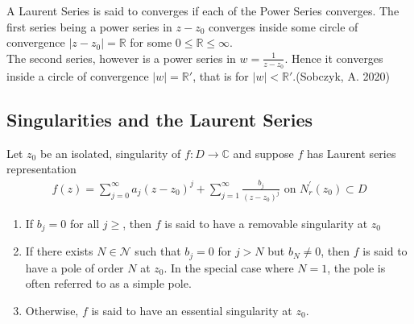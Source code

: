 \documentclass[11pt]{report}
\newcommand{\sprime}{'}
\newcommand{\dsp}{\displaystyle}
\newcommand{\NI}{\noindent}
\newcommand{\real}{ \mathbb{R}}
\newcommand{\complex}{\mathbb{C}}
\begin{document}
	\NI A Laurent Series is said to converges if each of the Power Series converges. The first series being a power series in $z-z_0$ converges inside some circle of convergence $|z-z_0|=\real$ for some $0\leq \real \leq \infty$.\\
	The second series, however is a power series in $\dsp w = \frac{1}{z-z_0}$. Hence it converges inside a circle of convergence $|w|=\real\sprime$, that is for $|w|<\real\sprime$.(Sobczyk, A. 2020)

	\subsection{Singularities and the Laurent Series}
	Let $z_0$ be an isolated, singularity of $f:D\rightarrow\complex$ and suppose $f$ has Laurent series representation
	\begin{eqnarray}
		f(z) = \sum_{j=0}^{\infty}a_j(z-z_0)^j + \sum_{j=1}^{\infty}\frac{b_j}{(z-z_0)^j} \text{ on } N_r^{\sprime}(z_0) \subset D
	\end{eqnarray}
	
	\begin{enumerate}
		\item If $b_j=0$ for all $j\geq $, then $f$ is said to have a removable singularity at $z_0$
		\item If there exists $N\in\mathcal{N}$ such that $b_j=0$ for $j>N$ but $b_N\neq 0 $, then $f$ is said to have a pole of order $N$ at $z_0$. In the special case where $N=1$, the pole is often referred to as a simple pole.
		\item Otherwise, $f$ is said to have an essential singularity at $z_0$. 
	\end{enumerate}
	
\end{document}
